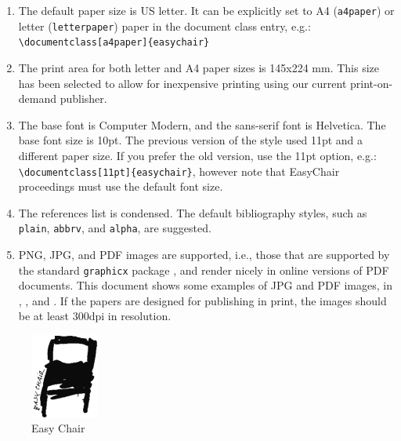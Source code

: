 \documentclass{easychair}
\begin{document}
\begin{enumerate}
\item
The default paper size is US letter. It can be explicitly set to A4 
(\texttt{a4paper}) or letter (\texttt{letterpaper}) paper in the
document class entry, e.g.:\\\verb+\documentclass[a4paper]{easychair}+

\item
The print area for both letter and A4 paper sizes is 145x224 mm. This size
has been selected to allow for inexpensive printing using our current
print-on-demand publisher.

\item
The base font is
Computer Modern,
and the {\sf sans-serif} font is
{\sf Helvetica}. The base font size is 10pt. The previous version of
the style used 11pt and a different paper size. If you prefer the old
version, use the 11pt option,
e.g.: \verb+\documentclass[11pt]{easychair}+, however note that
EasyChair proceedings must use the default font size.

\item
The references list is condensed. The default bibliography styles, such as
\texttt{plain}, \texttt{abbrv}, and \texttt{alpha}, are suggested.

\item
PNG, JPG, and PDF images are supported, i.e., those that are supported by 
the standard \texttt{graphicx} package \cite{graphicx-package}, and render 
nicely in online versions of PDF documents.
This document shows some examples of JPG and PDF images, in 
, , and
. If the papers are designed for publishing
in print, the images should be at least 300dpi in resolution.

\end{enumerate}

\begin{figure}[htp]
	\begin{centering}
	\includegraphics[width=0.2\textwidth]{images/chairEC}
	\caption{Easy Chair}
	\label{fig:easychair}
	\end{centering}
\end{figure}
\end{document}
